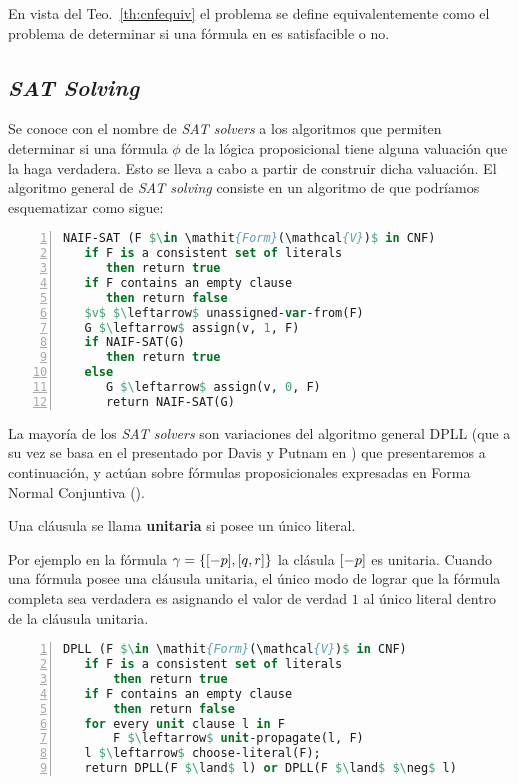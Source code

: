 En vista del Teo.~\ref{th:cnfequiv} el problema \sat se define equivalentemente
como el problema de determinar si una fórmula en \cnf es satisfacible o no.


\subsection{\emph{SAT Solving}}

Se conoce con el nombre de \emph{SAT solvers} a los algoritmos que permiten
determinar si una fórmula $\phi$ de la lógica proposicional tiene alguna
valuación que la haga verdadera. Esto se lleva a cabo a partir de construir dicha valuación.
El algoritmo general de  \emph{SAT solving} consiste en un algoritmo de \bt que podríamos esquematizar como sigue:

\begin{lstlisting}[mathescape,language=Pascal,frame=single,numbers=left,caption={Algoritmo \emph{naïf}},label=naif] 
NAIF-SAT (F $\in \mathit{Form}(\mathcal{V})$ in CNF)
   if F is a consistent set of literals
      then return true
   if F contains an empty clause
      then return false
   $v$ $\leftarrow$ unassigned-var-from(F)
   G $\leftarrow$ assign(v, 1, F)
   if NAIF-SAT(G)
      then return true
   else
      G $\leftarrow$ assign(v, 0, F)
      return NAIF-SAT(G)
\end{lstlisting}

La mayoría de los \emph{SAT solvers} son variaciones del algoritmo general DPLL\cite{Davis:1962:MPT:368273.368557} (que a su vez se basa en el presentado por Davis y Putnam en \cite{Davis:1960:CPQ:321033.321034}) que presentaremos a continuación, y actúan sobre fórmulas proposicionales expresadas en Forma Normal Conjuntiva (\cnf). 

\begin{definition} 
 Una cláusula se llama \textbf{unitaria} si
posee un único literal.
\end{definition}

Por ejemplo en la fórmula $\gamma = \{[-p], [q, r]\}$ la clásula $[-p]$ es
unitaria. Cuando una fórmula \cnf posee una cláusula unitaria, el único modo de
lograr que la fórmula completa sea verdadera es asignando el valor de verdad
$1$ al único literal dentro de la cláusula unitaria.

\begin{lstlisting}[mathescape,language=Pascal,frame=single,numbers=left,caption={Algoritmo DPLL},label=DPLL] 
DPLL (F $\in \mathit{Form}(\mathcal{V})$ in CNF)
   if F is a consistent set of literals
       then return true
   if F contains an empty clause
       then return false
   for every unit clause l in F
       F $\leftarrow$ unit-propagate(l, F)
   l $\leftarrow$ choose-literal(F);
   return DPLL(F $\land$ l) or DPLL(F $\land$ $\neg$ l)
\end{lstlisting}

